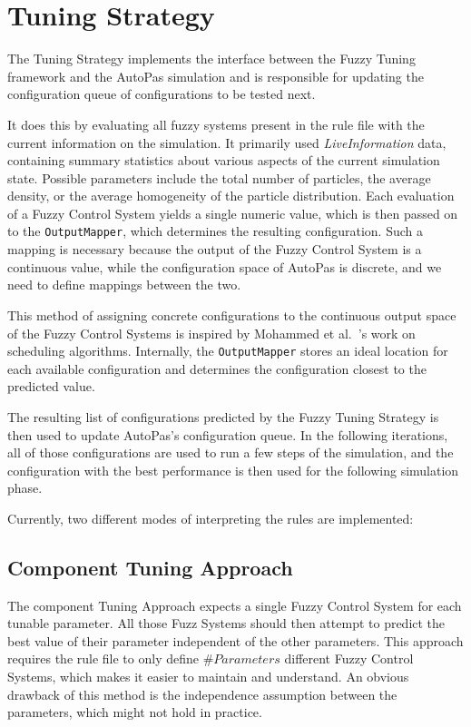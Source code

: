 \section{Tuning Strategy}

The Tuning Strategy implements the interface between the Fuzzy Tuning framework and the AutoPas simulation and is responsible for updating the configuration queue of configurations to be tested next.

It does this by evaluating all fuzzy systems present in the rule file with the current information on the simulation. It primarily used \emph{LiveInformation} data, containing summary statistics about various aspects of the current simulation state. Possible parameters include the total number of particles, the average density, or the average homogeneity of the particle distribution. Each evaluation of a Fuzzy Control System yields a single numeric value, which is then passed on to the \texttt{OutputMapper}, which determines the resulting configuration. Such a mapping is necessary because the output of the Fuzzy Control System is a continuous value, while the configuration space of AutoPas is discrete, and we need to define mappings between the two.

This method of assigning concrete configurations to the continuous output space of the Fuzzy Control Systems is inspired by Mohammed et al.~\cite{Mohammed2022}'s work on scheduling algorithms. Internally, the \texttt{OutputMapper} stores an ideal location for each available configuration and determines the configuration closest to the predicted value.

The resulting list of configurations predicted by the Fuzzy Tuning Strategy is then used to update AutoPas's configuration queue. In the following iterations, all of those configurations are used to run a few steps of the simulation, and the configuration with the best performance is then used for the following simulation phase.

Currently, two different modes of interpreting the rules are implemented:

\subsection{Component Tuning Approach}

The component Tuning Approach expects a single Fuzzy Control System for each tunable parameter. All those Fuzz Systems should then attempt to predict the best value of their parameter independent of the other parameters. This approach requires the rule file to only define $\#Parameters$ different Fuzzy Control Systems, which makes it easier to maintain and understand. An obvious drawback of this method is the independence assumption between the parameters, which might not hold in practice.

